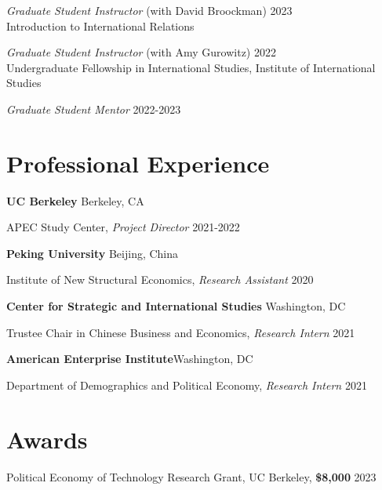 \documentclass[margin,line]{res}
\begin{document}
\begin{resume}
\vspace{-.35cm}
{\em Graduate Student Instructor} (with David Broockman) \hfill {2023}\\

\vspace{-.4cm}
{Introduction to International Relations} 

\vspace{-.35cm}
{\em Graduate Student Instructor} (with Amy Gurowitz) \hfill {2022}\\

\vspace{-.4cm}
{Undergraduate Fellowship in International Studies}, Institute of International Studies 

\vspace{-.35cm}
{\em Graduate Student Mentor} \hfill {2022-2023}\\
\vspace*{-.13in}  

\section{\sc Professional Experience}

{\bf UC Berkeley} \hfill {Berkeley, CA} 

\vspace{-.35cm}
{APEC Study Center}, {\em Project Director} \hfill {2021-2022}

\vspace{-.2cm}
{\bf Peking University} \hfill {Beijing, China} 

\vspace{-.35cm}
{Institute of New Structural Economics}, {\em Research Assistant} \hfill {2020}

\vspace{-.2cm}
{\bf Center for Strategic and International Studies} \hfill {Washington, DC}

\vspace{-.35cm}
{Trustee Chair in Chinese Business and Economics}, {\em Research Intern} \hfill {2021}

\vspace{-.2cm}
{\bf American Enterprise Institute}\hfill {Washington, DC}

\vspace{-.35cm}
{Department of Demographics and Political Economy}, {\em Research Intern} \hfill {2021}

\section{\sc Awards} 
{Political Economy of Technology Research Grant, UC Berkeley, {\bf\$8,000}} \hfill {2023}


\end{resume}
\end{document}
